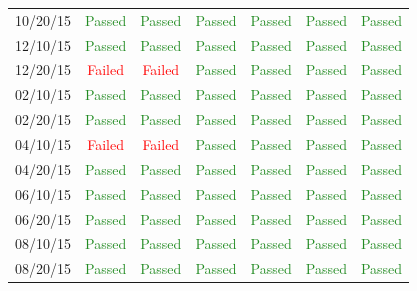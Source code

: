 \documentclass[]{BasiliskReportMemo}
\begin{document}
\begin{table}[htbp]
\begin{tabular}{c | c | c | c | c | c | c}
      10/20/15 & \textcolor{ForestGreen}{Passed} & \textcolor{ForestGreen}{Passed} &  \textcolor{ForestGreen}{Passed}&  \textcolor{ForestGreen}{Passed} & \textcolor{ForestGreen}{Passed} &  \textcolor{ForestGreen}{Passed}\\
      12/10/15 & \textcolor{ForestGreen}{Passed} & \textcolor{ForestGreen}{Passed} &  \textcolor{ForestGreen}{Passed}&  \textcolor{ForestGreen}{Passed} & \textcolor{ForestGreen}{Passed} &  \textcolor{ForestGreen}{Passed}\\
      12/20/15 & \textcolor{red}{Failed} & \textcolor{red}{Failed} &  \textcolor{ForestGreen}{Passed}&  \textcolor{ForestGreen}{Passed} & \textcolor{ForestGreen}{Passed} &  \textcolor{ForestGreen}{Passed}\\
      02/10/15 & \textcolor{ForestGreen}{Passed} & \textcolor{ForestGreen}{Passed} &  \textcolor{ForestGreen}{Passed}&  \textcolor{ForestGreen}{Passed} & \textcolor{ForestGreen}{Passed} &  \textcolor{ForestGreen}{Passed}\\
      02/20/15 & \textcolor{ForestGreen}{Passed} & \textcolor{ForestGreen}{Passed} &  \textcolor{ForestGreen}{Passed}&  \textcolor{ForestGreen}{Passed} & \textcolor{ForestGreen}{Passed} &  \textcolor{ForestGreen}{Passed}\\
      04/10/15 & \textcolor{red}{Failed} & \textcolor{red}{Failed} &  \textcolor{ForestGreen}{Passed}&  \textcolor{ForestGreen}{Passed} & \textcolor{ForestGreen}{Passed} &  \textcolor{ForestGreen}{Passed}\\
      04/20/15 & \textcolor{ForestGreen}{Passed} & \textcolor{ForestGreen}{Passed} &  \textcolor{ForestGreen}{Passed}&  \textcolor{ForestGreen}{Passed} & \textcolor{ForestGreen}{Passed} &  \textcolor{ForestGreen}{Passed}\\
      06/10/15 & \textcolor{ForestGreen}{Passed} & \textcolor{ForestGreen}{Passed} &  \textcolor{ForestGreen}{Passed}&  \textcolor{ForestGreen}{Passed} & \textcolor{ForestGreen}{Passed} &  \textcolor{ForestGreen}{Passed}\\
      06/20/15 & \textcolor{ForestGreen}{Passed} & \textcolor{ForestGreen}{Passed} &  \textcolor{ForestGreen}{Passed}&  \textcolor{ForestGreen}{Passed} & \textcolor{ForestGreen}{Passed} &  \textcolor{ForestGreen}{Passed}\\
      08/10/15 & \textcolor{ForestGreen}{Passed} & \textcolor{ForestGreen}{Passed} &  \textcolor{ForestGreen}{Passed}&  \textcolor{ForestGreen}{Passed} & \textcolor{ForestGreen}{Passed} &  \textcolor{ForestGreen}{Passed}\\
      08/20/15 & \textcolor{ForestGreen}{Passed} & \textcolor{ForestGreen}{Passed} &  \textcolor{ForestGreen}{Passed}&  \textcolor{ForestGreen}{Passed} & \textcolor{ForestGreen}{Passed} &  \textcolor{ForestGreen}{Passed}\\

\end{tabular}
\end{table}
\end{document}
